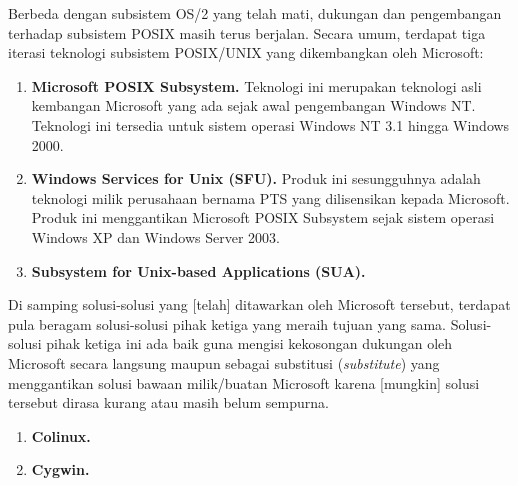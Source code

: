 Berbeda dengan subsistem OS/2 yang telah mati, dukungan dan pengembangan terhadap subsistem POSIX masih terus berjalan. Secara umum, terdapat tiga iterasi teknologi subsistem POSIX/UNIX yang dikembangkan oleh Microsoft:

\begin{enumerate}
    \item \textbf{Microsoft POSIX Subsystem.} Teknologi ini merupakan teknologi asli kembangan Microsoft yang ada sejak awal pengembangan Windows NT. Teknologi ini tersedia untuk sistem operasi Windows NT 3.1 hingga Windows 2000.
    \item \textbf{Windows Services for Unix (SFU).} Produk ini sesungguhnya adalah teknologi milik perusahaan bernama PTS yang dilisensikan kepada Microsoft. Produk ini menggantikan Microsoft POSIX Subsystem sejak sistem operasi Windows XP dan Windows Server 2003.
    \item \textbf{Subsystem for Unix-based Applications (SUA).}
\end{enumerate}



Di samping solusi-solusi yang [telah] ditawarkan oleh Microsoft tersebut, terdapat pula beragam solusi-solusi pihak ketiga yang meraih tujuan yang sama. Solusi-solusi pihak ketiga ini ada baik guna mengisi kekosongan dukungan oleh Microsoft secara langsung maupun sebagai substitusi (\textit{substitute}) yang menggantikan solusi bawaan milik/buatan Microsoft karena [mungkin] solusi tersebut dirasa kurang atau masih belum sempurna.

\begin{enumerate}
    \item \textbf{Colinux.}

    \item \textbf{Cygwin.}
\end{enumerate}

